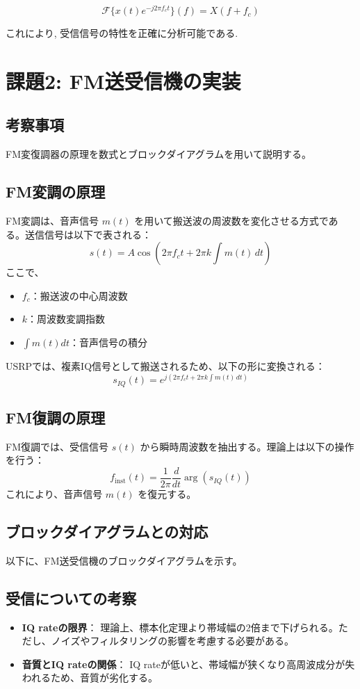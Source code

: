\documentclass[a4paper, twocolumn]{article} %
\begin{document}
\[
\mathcal{F}\{x(t) e^{-j2\pi f_c t}\}(f) = X(f + f_c)
\]

これにより, 受信信号の特性を正確に分析可能である.


\section*{課題2: FM送受信機の実装}

\subsection*{考察事項}
FM変復調器の原理を数式とブロックダイアグラムを用いて説明する。

\subsection*{FM変調の原理}
FM変調は、音声信号 \(m(t)\) を用いて搬送波の周波数を変化させる方式である。送信信号は以下で表される：
\[
s(t) = A \cos \left( 2 \pi f_c t + 2 \pi k \int m(t) \, dt \right)
\]
ここで、
\begin{itemize}
    \item \(f_c\)：搬送波の中心周波数
    \item \(k\)：周波数変調指数
    \item \(\int m(t) dt\)：音声信号の積分
\end{itemize}

USRPでは、複素IQ信号として搬送されるため、以下の形に変換される：
\[
s_{IQ}(t) = e^{j \left( 2 \pi f_c t + 2 \pi k \int m(t) \, dt \right)}
\]

\subsection*{FM復調の原理}
FM復調では、受信信号 \(s(t)\) から瞬時周波数を抽出する。理論上は以下の操作を行う：
\[
f_{\text{inst}}(t) = \frac{1}{2 \pi} \frac{d}{dt} \arg \left( s_{IQ}(t) \right)
\]
これにより、音声信号 \(m(t)\) を復元する。

\subsection*{ブロックダイアグラムとの対応}
以下に、FM送受信機のブロックダイアグラムを示す。


\subsection*{受信についての考察}
\begin{itemize}
    \item \textbf{IQ rateの限界}：
    理論上、標本化定理より帯域幅の2倍まで下げられる。ただし、ノイズやフィルタリングの影響を考慮する必要がある。
    \item \textbf{音質とIQ rateの関係}：
    IQ rateが低いと、帯域幅が狭くなり高周波成分が失われるため、音質が劣化する。
\end{itemize}
\end{document}
